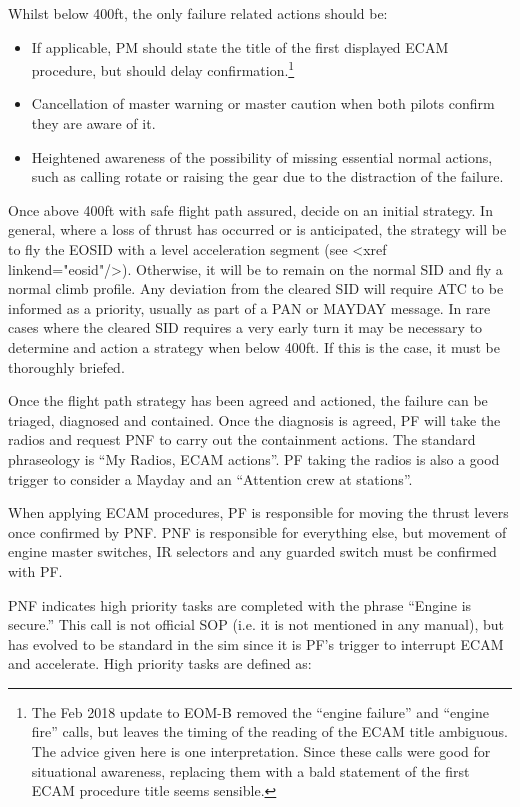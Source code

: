 \documentclass[a5paper,11pt,twoside]{book}
\begin{document}
Whilst below 400ft, the only failure related actions should be:
\begin{itemize}
\item If applicable, PM should state the title of the first displayed ECAM
  procedure, but should delay confirmation.\footnote{ The Feb 2018 update to
  EOM-B removed the “engine failure” and “engine fire” calls, but leaves the
  timing of the reading of the ECAM title ambiguous. The advice given here is
  one interpretation. Since these calls were good for situational awareness,
  replacing them with a bald statement of the first ECAM procedure title seems
  sensible.}

\item Cancellation of master warning or master caution when both pilots confirm
  they are aware of it.

\item Heightened awareness of the possibility of missing essential normal
  actions, such as calling rotate or raising the gear due to the distraction of
  the failure.
\end{itemize}


Once above 400ft with safe flight path assured, decide on an initial
strategy. In general, where a loss of thrust has occurred or is anticipated, the
strategy will be to fly the EOSID with a level acceleration segment (see <xref
linkend="eosid"/>). Otherwise, it will be to remain on the normal SID and fly a
normal climb profile. Any deviation from the cleared SID will require ATC to be
informed as a priority, usually as part of a PAN or MAYDAY message. In rare
cases where the cleared SID requires a very early turn it may be necessary to
determine and action a strategy when below 400ft. If this is the case, it must
be thoroughly briefed.

Once the flight path strategy has been agreed and actioned, the failure can be
triaged, diagnosed and contained. Once the diagnosis is agreed, PF will take the
radios and request PNF to carry out the containment actions. The standard
phraseology is “My Radios, ECAM actions”. PF taking the radios is also a good
trigger to consider a Mayday and an “Attention crew at stations”.

When applying ECAM procedures, PF is responsible for moving the thrust levers
once confirmed by PNF. PNF is responsible for everything else, but movement of
engine master switches, IR selectors and any guarded switch must be confirmed
with PF.

PNF indicates high priority tasks are completed with the phrase “Engine is
secure.”  This call is not official SOP (i.e. it is not mentioned in any
manual), but has evolved to be standard in the sim since it is PF’s trigger to
interrupt ECAM and accelerate.  High priority tasks are defined as:
\end{document}
